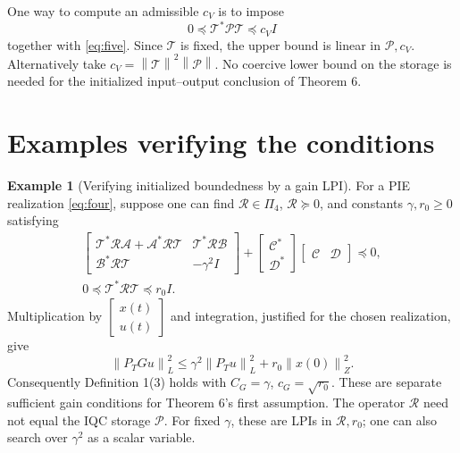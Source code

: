 \documentclass[10pt,twocolumn,letterpaper]{article}
\theoremstyle{definition}
\newtheorem{example}{Example}
\theoremstyle{plain}
\newcommand{\col}[1]{\begin{bmatrix}#1\end{bmatrix}}
\newcommand{\norm}[1]{\left\lVert #1\right\rVert}
\newcommand{\TT}{\mathcal T}
\newcommand{\opA}{\mathcal A}
\newcommand{\opB}{\mathcal B}
\newcommand{\opC}{\mathcal C}
\newcommand{\opD}{\mathcal D}
\newcommand{\opP}{\mathcal P}
\begin{document}
One way to compute an admissible $c_V$ is to impose
\[
 0\preceq\TT^*\opP\TT\preceq c_V I
\]
together with \eqref{eq:five}. Since $\TT$ is fixed, the upper bound
is linear in $\opP,c_V$. Alternatively take
$c_V=\norm{\TT}^2\norm{\opP}$. No coercive lower bound on the storage
is needed for the initialized input--output conclusion of Theorem 6.

\section*{Examples verifying the conditions}

\begin{example}[Verifying initialized boundedness by a gain LPI]
For a PIE realization \eqref{eq:four}, suppose one can find
$\mathcal R\in\Pi_4$, $\mathcal R\succeq0$, and constants
$\gamma,r_0\geq0$ satisfying
\begin{gather*}
 \col{\TT^*\mathcal R\opA+\opA^*\mathcal R\TT&
          \TT^*\mathcal R\opB\\
       \opB^*\mathcal R\TT&-\gamma^2I}
 +\col{\opC^*\\\opD^*}
       \begin{bmatrix}\opC&\opD\end{bmatrix}\preceq0,\\
 0\preceq\TT^*\mathcal R\TT\preceq r_0 I.
\end{gather*}
Multiplication by $\col{x(t)\\u(t)}$ and integration, justified for
the chosen realization, give
\[
 \norm{P_TGu}_L^2
 \leq\gamma^2\norm{P_Tu}_L^2+r_0\norm{x(0)}_Z^2.
\]
Consequently Definition 1(3) holds with
$C_G=\gamma$, $c_G=\sqrt{r_0}$. These are separate sufficient gain
conditions for Theorem 6's first assumption. The operator
$\mathcal R$ need not equal the IQC storage $\opP$. For fixed
$\gamma$, these are LPIs in $\mathcal R,r_0$; one can also search
over $\gamma^2$ as a scalar variable.
\end{example}
\end{document}
